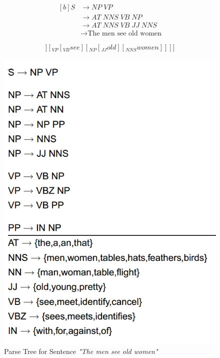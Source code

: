 \documentclass{article}
\begin{document}
\begin{equation}
\begin{aligned}[b]
	S &\rightarrow NP\; VP \\
	&\rightarrow AT \; NNS \; VB \; NP \\
	&\rightarrow AT \; NNS \; VB \; JJ \; NNS \\
	&\rightarrow \text{The men see old women}
	\label{eq:example-sentence-derivation}
\end{aligned}
\end{equation}

\begin{equation}
	[_{S}[_{NP}[_{AT}the] [_{NNS}men]] [_{VP}[_{VB}see] [_{NP}[_{JJ}old] [_{NNS}women]]]]
	\label{eq:example-sentence-derivation-bracketing}
\end{equation}

\begin{figure}
	\centering
	\includegraphics[scale=0.4]{figures/example-grammar.png}
	\caption{Parse Tree for Sentence \textit{"The men see old women"}}
	\label{fig:example-sentence-derivation}
\end{figure}
\end{document}
